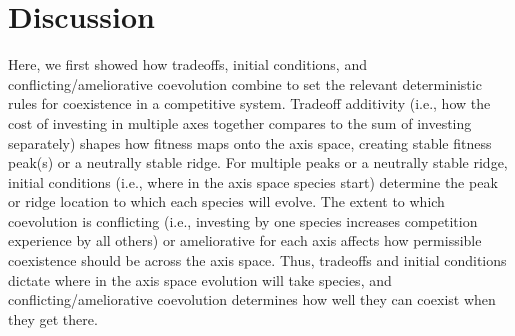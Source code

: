 
\section*{Discussion}

Here, we first showed how tradeoffs, initial conditions, and conflicting/ameliorative coevolution
combine to set the relevant deterministic rules for coexistence in a competitive system.
Tradeoff additivity (i.e., how the cost of investing in multiple axes together 
compares to the sum of investing separately) shapes how fitness maps onto the axis space,
creating stable fitness peak(s) or a neutrally stable ridge.
For multiple peaks or a neutrally stable ridge, initial conditions (i.e., where in the 
axis space species start) determine the peak or ridge location to which each species will evolve.
The extent to which coevolution is conflicting (i.e., investing by one species increases 
competition experience by all others) or ameliorative for each axis affects
how permissible coexistence should be across the axis space.
Thus, tradeoffs and initial conditions dictate where in the axis space evolution will take species, and 
conflicting/ameliorative coevolution determines how well they can 
coexist when they get there.






